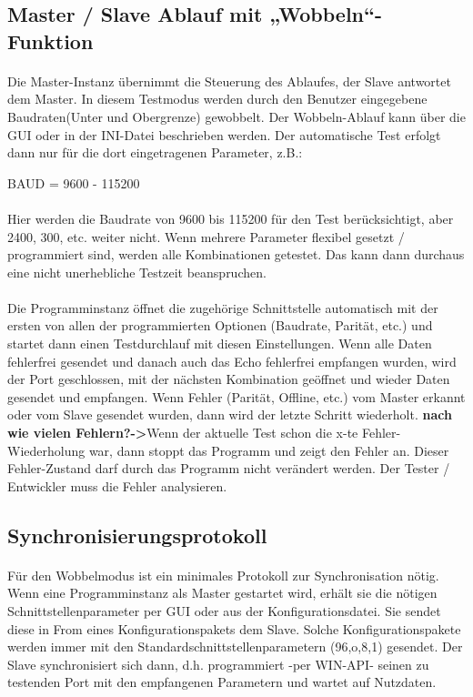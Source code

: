 \subsection{Master / Slave Ablauf mit „Wobbeln“-Funktion}
\paragraph{}
Die Master-Instanz übernimmt die Steuerung des Ablaufes, der Slave antwortet dem Master. In diesem Testmodus werden durch den Benutzer eingegebene Baudraten(Unter und Obergrenze) gewobbelt. Der Wobbeln-Ablauf kann über die GUI oder in der INI-Datei beschrieben werden. Der automatische Test erfolgt dann nur für die dort eingetragenen Parameter, z.B.:

\begin{center}
BAUD = 9600 - 115200
\end{center}
\paragraph{}
Hier werden die Baudrate von 9600 bis 115200 für den Test berücksichtigt, aber 2400, 300, etc. weiter nicht. Wenn mehrere Parameter flexibel gesetzt / programmiert sind, werden alle Kombinationen getestet. Das kann dann durchaus eine nicht unerhebliche Testzeit beanspruchen.
\paragraph{}
Die Programminstanz öffnet die zugehörige Schnittstelle automatisch mit der ersten von allen der programmierten Optionen (Baudrate, Parität, etc.) und startet dann einen Testdurchlauf mit diesen Einstellungen. Wenn alle Daten fehlerfrei gesendet und danach auch das Echo fehlerfrei empfangen wurden,  wird der Port geschlossen, mit der nächsten Kombination geöffnet und wieder Daten gesendet und empfangen. Wenn Fehler (Parität, Offline, etc.) vom Master erkannt oder vom Slave gesendet wurden, dann wird der letzte Schritt wiederholt. \textbf{nach wie vielen Fehlern?->}Wenn der aktuelle Test schon die x-te Fehler-Wiederholung war, dann stoppt das Programm und zeigt den Fehler an. Dieser Fehler-Zustand darf durch das Programm nicht verändert werden. Der Tester / Entwickler muss die Fehler analysieren.

\subsection{Synchronisierungsprotokoll}
\paragraph{}
Für den Wobbelmodus ist ein minimales Protokoll zur Synchronisation nötig. Wenn eine Programminstanz als Master gestartet wird, erhält sie die nötigen Schnittstellenparameter per GUI oder aus der Konfigurationsdatei. Sie sendet diese in From eines Konfigurationspakets dem Slave. Solche Konfigurationspakete werden immer mit den Standardschnittstellenparametern (96,o,8,1) gesendet. Der Slave synchronisiert sich dann, d.h. programmiert -per WIN-API- seinen zu testenden Port mit den empfangenen Parametern und wartet auf Nutzdaten.
